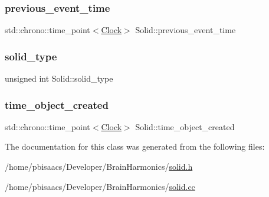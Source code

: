 \subsubsection{\texorpdfstring{previous\+\_\+event\+\_\+time}{previous\_event\_time}}
{\footnotesize\ttfamily std\+::chrono\+::time\+\_\+point$<$\mbox{\hyperlink{universe_8h_a0ef8d951d1ca5ab3cfaf7ab4c7a6fd80}{Clock}}$>$ Solid\+::previous\+\_\+event\+\_\+time\hspace{0.3cm}{\ttfamily [private]}}

\mbox{\label{classSolid_a4cb0429a28598d5501553787524b705d}} 
\subsubsection{\texorpdfstring{solid\+\_\+type}{solid\_type}}
{\footnotesize\ttfamily unsigned int Solid\+::solid\+\_\+type\hspace{0.3cm}{\ttfamily [private]}}

\mbox{\label{classSolid_ab511520c2e523c203c1ca7b97f573f65}} 
\subsubsection{\texorpdfstring{time\+\_\+object\+\_\+created}{time\_object\_created}}
{\footnotesize\ttfamily std\+::chrono\+::time\+\_\+point$<$\mbox{\hyperlink{universe_8h_a0ef8d951d1ca5ab3cfaf7ab4c7a6fd80}{Clock}}$>$ Solid\+::time\+\_\+object\+\_\+created\hspace{0.3cm}{\ttfamily [private]}}



The documentation for this class was generated from the following files\+:\begin{DoxyCompactItemize}
\item 
/home/pbisaacs/\+Developer/\+Brain\+Harmonics/\mbox{\hyperlink{solid_8h}{solid.\+h}}\item 
/home/pbisaacs/\+Developer/\+Brain\+Harmonics/\mbox{\hyperlink{solid_8cc}{solid.\+cc}}\end{DoxyCompactItemize}
